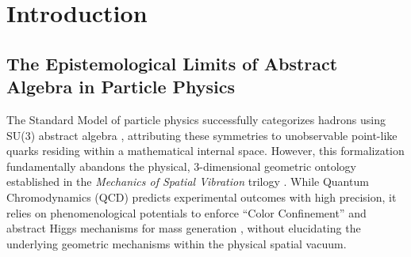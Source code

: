 \documentclass[reprint,amsmath,amssymb,aps,prd]{revtex4-2}
\begin{document}
\begin{abstract}
Finally, we formalize the arbitrary quantum number of ``Strangeness'' as the torsional winding tension ($\mathcal{W}$) of the topological knot. Strong interaction conservation is derived via Kelvin's circulation theorem for an ideal fluid, whereas weak interaction decay is mathematically modeled as topological decoherence (unknotting). This unwinding process is strictly governed by the same real-valued, non-linear \textbf{`spatial geometric viscosity'} ($+\gamma(S - \langle S \rangle)$) that drives \textbf{`Phase Turbulence'} (Part I). By bridging abstract group theory with deterministic spatial geomechanics, this study offers a complete mathematical realization of a \textbf{`Periodic Table of Space,'} seamlessly unifying the microscopic particle zoo with continuous spatial tensor dynamics under the universal principle of \textbf{`Fractal Scale Symmetry'} (Part III).
\end{abstract}

\maketitle

\section{Introduction}

\subsection{The Epistemological Limits of Abstract Algebra in Particle Physics}
The Standard Model of particle physics successfully categorizes hadrons using SU(3) abstract algebra \cite{GellMann1964}, attributing these symmetries to unobservable point-like quarks residing within a mathematical internal space. However, this formalization fundamentally abandons the physical, 3-dimensional geometric ontology established in the \textit{Mechanics of Spatial Vibration} trilogy \cite{YooPart1, YooPart2, YooPart3}. While Quantum Chromodynamics (QCD) predicts experimental outcomes with high precision, it relies on phenomenological potentials to enforce ``Color Confinement'' \cite{Wilson1974} and abstract Higgs mechanisms for mass generation \cite{Higgs1964}, without elucidating the underlying geometric mechanisms within the physical spatial vacuum.
\end{document}
